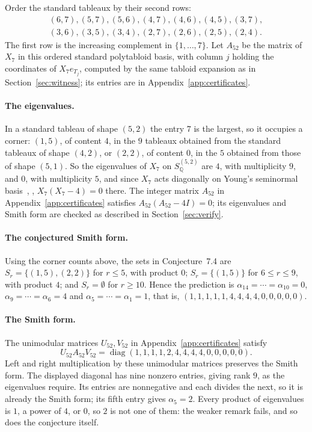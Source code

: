 \documentclass[11pt]{article}
\theoremstyle{remark}
\newcommand{\Q}{\mathbb{Q}}
\begin{document}
Order the standard tableaux by their second rows:
\[
\begin{gathered}(6,7),(5,7),(5,6),(4,7),(4,6),(4,5),(3,7),\\
(3,6),(3,5),(3,4),(2,7),(2,6),(2,5),(2,4).\end{gathered}
\]
The first row is the increasing complement in $\{1,\dots,7\}$. Let $A_{52}$
be the matrix of $X_7$ in this ordered standard polytabloid basis, with
column $j$ holding the coordinates of $X_7e_{T_j}$, computed by the same
tabloid expansion as in Section~\ref{sec:witness}; its entries are in
Appendix~\ref{app:certificates}.

\paragraph{The eigenvalues.} In a standard tableau of
shape $(5,2)$ the entry $7$ is the largest, so it occupies a corner: $(1,5)$,
of content $4$, in the $9$ tableaux obtained from the standard tableaux of
shape $(4,2)$, or $(2,2)$, of content $0$, in the $5$ obtained from those of
shape $(5,1)$. So the eigenvalues of $X_7$ on $S^{(5,2)}_\Q$ are $4$, with
multiplicity $9$, and $0$, with multiplicity $5$, and since $X_7$ acts
diagonally on Young's seminormal basis~\cite{murphy}, \cite[Theorem~5.8]{vo}, $X_7(X_7-4)=0$
there. The integer matrix $A_{52}$ in Appendix~\ref{app:certificates} satisfies $A_{52}(A_{52}-4I)=0$; its eigenvalues and Smith form are checked as described in Section~\ref{sec:verify}.

\paragraph{The conjectured Smith form.} Using the corner counts above, the sets in
Conjecture~7.4 are $S_r=\{(1,5),(2,2)\}$ for $r\le5$, with product $0$;
$S_r=\{(1,5)\}$ for $6\le r\le9$, with product $4$; and $S_r=\emptyset$ for
$r\ge10$. Hence the prediction is $\alpha_{14}=\cdots=\alpha_{10}=0$,
$\alpha_9=\cdots=\alpha_6=4$ and $\alpha_5=\cdots=\alpha_1=1$, that is,
$(1,1,1,1,1,4,4,4,4,0,0,0,0,0)$.

{\sloppy
\paragraph{The Smith form.} The unimodular matrices $U_{52},V_{52}$ in Appendix~\ref{app:certificates} satisfy
\[ U_{52}A_{52}V_{52}=\operatorname{diag}(1,1,1,1,2,4,4,4,4,0,0,0,0,0). \]
 Left and right multiplication by these unimodular matrices preserves the Smith form. The displayed diagonal has nine nonzero entries, giving rank $9$, as the eigenvalues require. Its entries are nonnegative and each divides the next, so it is already the Smith form; its fifth entry gives $\alpha_5=2$. Every product of eigenvalues is $1$,
a power of $4$, or $0$, so $2$ is not one of them: the weaker remark fails,
and so does the conjecture itself. \par}
\end{document}
